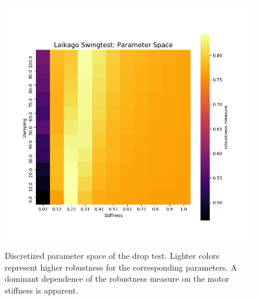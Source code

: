     \begin{figure}[h]
    \centering
    \includegraphics[width=.6\linewidth]{figures/swingtest_ps.png}
    \caption[Discretized Parameter Space, Swing Test]{Discretized parameter space of the drop test. Lighter colors represent higher robustness for the corresponding parameters. A dominant dependence of the robustness measure on the motor stiffness is apparent.}
    \label{fig:swingps}
    \end{figure}    


